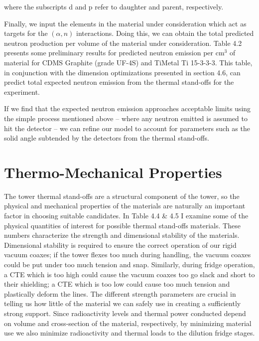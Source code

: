 \documentclass{report}
\begin{document}
where the subscripts d and p refer to daughter and parent, respectively.

Finally, we input the elements in the material under consideration which act as targets for the $(\alpha,n)$ interactions. Doing this, we can obtain the total predicted neutron production per volume of the material under consideration. Table 4.2 presents some preliminary results for predicted neutron emission per cm$^3$ of material for CDMS Graphite (grade UF-4S) and TiMetal Ti 15-3-3-3. This table, in conjunction with the dimension optimizations presented in section 4.6, can predict total expected neutron emission from the thermal stand-offs for the experiment.

If we find that the expected neutron emission approaches acceptable limits using the simple process mentioned above -- where any neutron emitted is assumed to hit the detector -- we can refine our model to account for parameters such as the solid angle subtended by the detectors from the thermal stand-offs.


\section{Thermo-Mechanical Properties}

The tower thermal stand-offs are a structural component of the tower, so the physical and mechanical properties of the materials are naturally an important factor in choosing suitable candidates. In Table 4.4 \& 4.5 I examine some of the physical quantities of interest for possible thermal stand-offs materials. These numbers characterize the strength and dimensional stability of the materials. Dimensional stability is required to ensure the correct operation of our rigid vacuum coaxes; if the tower flexes too much during handling, the vacuum coaxes could be put under too much tension and snap. Similarly, during fridge operation, a CTE which is too high could cause the vacuum coaxes too go slack and short to their shielding; a CTE which is too low could cause too much tension and plastically deform the lines. The different strength parameters are crucial in telling us how little of the material we can safely use in creating a sufficiently strong support. Since radioactivity levels and thermal power conducted depend on volume and cross-section of the material, respectively, by minimizing material use we also minimize radioactivity and thermal loads to the dilution fridge stages.
\end{document}
